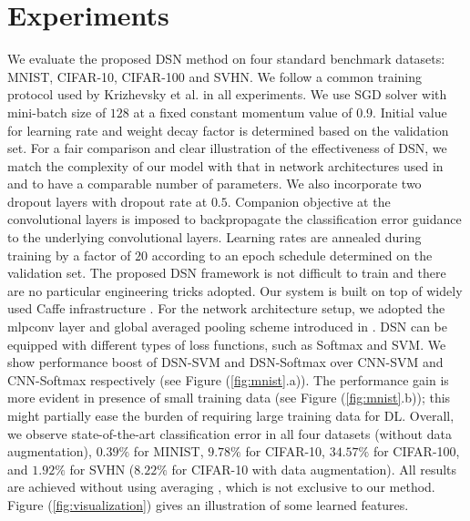 \documentclass{article} %
\begin{document}
\section{Experiments}
\vspace{-2mm}
We evaluate the proposed DSN method on four standard benchmark datasets: MNIST, CIFAR-10, CIFAR-100 and SVHN. 
We follow a common training protocol used by Krizhevsky et al. \cite{imagenet} in all experiments. 
We use SGD solver with mini-batch size of $128$ at a fixed constant momentum value of $0.9$. Initial value for learning rate and weight decay factor is determined based on the validation set. For a fair comparison and clear illustration of the effectiveness of DSN, we match the complexity of our model with that in network architectures used in \cite{NIN} and \cite{maxout} to have a comparable number of parameters. We also incorporate two dropout layers with dropout rate at $0.5$. Companion objective at the convolutional layers is imposed to backpropagate the classification error guidance to the underlying convolutional layers. Learning rates are annealed during training by a factor of $20$ according to an epoch schedule determined on the validation set. The proposed DSN framework is not difficult to train and there are no particular engineering tricks adopted. Our system is built on top of widely used Caffe infrastructure \cite{caffe}.
For the network architecture setup, we adopted the mlpconv layer and global averaged pooling scheme introduced in \cite{NIN}. 
DSN can be equipped with different types of loss functions, such as Softmax and SVM. We show performance boost of DSN-SVM and DSN-Softmax over CNN-SVM and CNN-Softmax respectively (see Figure (\ref{fig:mnist}.a)). The performance gain is more evident in presence of small training data (see Figure (\ref{fig:mnist}.b)); this might partially ease the burden of requiring large training data for DL. Overall, we observe state-of-the-art classification error in all four datasets (without data augmentation), $0.39\%$ for MINIST, $9.78\%$ for CIFAR-10, $34.57\%$ for CIFAR-100, and $1.92\%$ for SVHN ($8.22\%$ for CIFAR-10 with data augmentation). All results are achieved without using averaging \cite{mulCOL}, which is not exclusive to our method. Figure (\ref{fig:visualization}) gives an illustration of some learned features.
\end{document}
